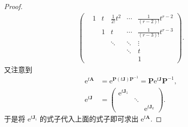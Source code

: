 \documentclass[../../main.tex]{subfiles}%
\begin{document}
\begin{proof}
\begin{align*}
\begin{pmatrix}
 & 1 & t & \frac{1}{2!}t^2 & \cdots & \frac{1}{(r - 2)!}t^{r - 2} \\
 & & 1 & t & \cdots & \frac{1}{(r - 3)!}t^{r - 3} \\
 & & & \ddots & \ddots & \vdots \\
 & & & & \ddots & t \\
 & & & & & 1
\end{pmatrix}.
\end{align*}
又注意到
\begin{align*}
\mathrm{e}^{t\boldsymbol{A}}&=\mathrm{e}^{\boldsymbol{P}(t\boldsymbol{J})\boldsymbol{P}^{-1}}=\boldsymbol{P}\mathrm{e}^{t\boldsymbol{J}}\boldsymbol{P}^{-1},\\
\mathrm{e}^{t\boldsymbol{J}}&=\begin{pmatrix}
\mathrm{e}^{t\boldsymbol{J}_1} & & \\
 & \ddots & \\
 & & \mathrm{e}^{t\boldsymbol{J}_k}
\end{pmatrix}.
\end{align*}
于是将 $\mathrm{e}^{t\boldsymbol{J}_i}$ 的式子代入上面的式子即可求出 $\mathrm{e}^{t\boldsymbol{A}}$. 

\end{proof}
\end{document}
